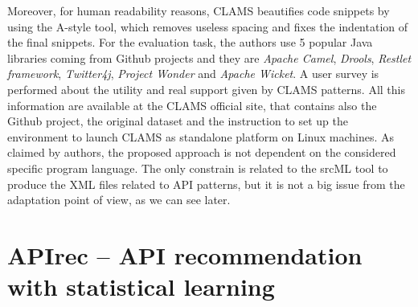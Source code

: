 Moreover, for human readability reasons, 
CLAMS beautifies code snippets by 
using the A-style tool, which removes 
useless spacing and fixes the indentation 
of the final snippets. For the evaluation 
task, the authors use 5 popular Java 
libraries coming from Github projects and 
they are \textit{Apache Camel}, 
\textit{Drools}, \textit{Restlet 
framework}, \textit{Twitter4j}, 
\textit{Project Wonder} and \textit{Apache 
Wicket}. 
A user survey is performed about the 
utility and real support given by CLAMS 
patterns. All this information are 
available at the CLAMS official site, that 
contains also the Github project, the 
original dataset and the instruction to 
set up the environment to launch CLAMS as 
standalone platform on Linux 
machines. As claimed by authors, the 
proposed approach is not dependent on the 
considered specific program language. The 
only constrain is related to the 
srcML tool to produce the XML files related 
to API patterns, but it is not a 
big issue from the adaptation point of 
view, as we can see later.



\section{APIrec -- API recommendation with 
statistical learning}

